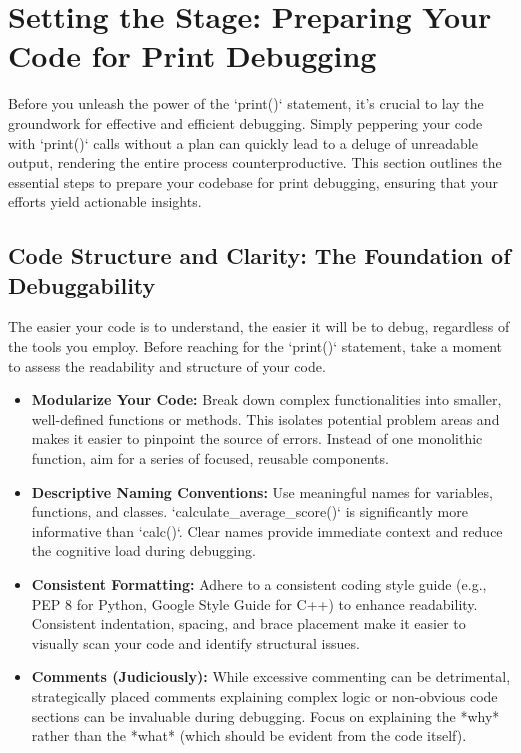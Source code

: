 \documentclass{article}
\begin{document}
\section*{Setting the Stage: Preparing Your Code for Print Debugging}

Before you unleash the power of the `print()` statement, it's crucial to lay the groundwork for effective and efficient debugging. Simply peppering your code with `print()` calls without a plan can quickly lead to a deluge of unreadable output, rendering the entire process counterproductive. This section outlines the essential steps to prepare your codebase for print debugging, ensuring that your efforts yield actionable insights.

\subsection*{Code Structure and Clarity: The Foundation of Debuggability}

The easier your code is to understand, the easier it will be to debug, regardless of the tools you employ. Before reaching for the `print()` statement, take a moment to assess the readability and structure of your code.

\begin{itemize}
    \item \textbf{Modularize Your Code:} Break down complex functionalities into smaller, well-defined functions or methods. This isolates potential problem areas and makes it easier to pinpoint the source of errors. Instead of one monolithic function, aim for a series of focused, reusable components.
    \item \textbf{Descriptive Naming Conventions:} Use meaningful names for variables, functions, and classes.  `calculate_average_score()` is significantly more informative than `calc()`.  Clear names provide immediate context and reduce the cognitive load during debugging.
    \item \textbf{Consistent Formatting:} Adhere to a consistent coding style guide (e.g., PEP 8 for Python, Google Style Guide for C++) to enhance readability. Consistent indentation, spacing, and brace placement make it easier to visually scan your code and identify structural issues.
    \item \textbf{Comments (Judiciously):} While excessive commenting can be detrimental, strategically placed comments explaining complex logic or non-obvious code sections can be invaluable during debugging. Focus on explaining the *why* rather than the *what* (which should be evident from the code itself).
\end{itemize}
\end{document}
